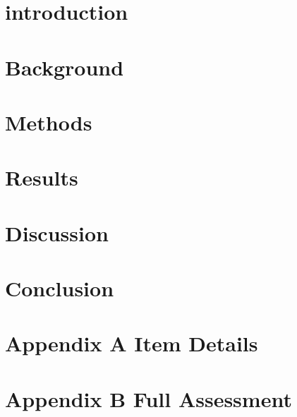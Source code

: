 \documentclass[draftthesis,tocnosub,noragright,centerchapter,12pt]{uiucecethesis09}
\begin{document}
\makeatletter
\makeatother

\mainmatter
\glsresetall

\chapter{introduction}


\chapter{Background}


\chapter{Methods}


\chapter{Results}


\chapter{Discussion}


\chapter{Conclusion}




%


\backmatter


%



\clearpage
\setcounter{table}{0}
\renewcommand{\thetable}{A.\arabic{table}}
\appendix
\chapter{Appendix A Item Details}

\chapter{Appendix B Full Assessment}


\end{document}
